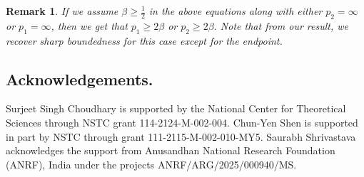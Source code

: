 \documentclass[a4paper,reqno]{amsart}
\newtheorem{remark}[thm]{Remark}
\numberwithin{equation}{section}
\begin{document}
	\begin{remark}
		If we assume $\beta\geq\frac{1}{2}$ in the above equations along with either $p_2=\infty$ or $p_1=\infty$, then we get that $p_1\geq2\beta$ or $p_2\geq2\beta$. Note that from our result, we recover sharp boundedness for this case except for the endpoint.
	\end{remark}
	
	
	\subsection*{Acknowledgements.} Surjeet Singh Choudhary is supported by the National Center for Theoretical Sciences through NSTC grant 114-2124-M-002-004. Chun-Yen Shen is supported in part by NSTC through grant 111-2115-M-002-010-MY5. Saurabh Shrivastava acknowledges the support from Anusandhan National Research Foundation (ANRF), India under the projects ANRF/ARG/2025/000940/MS. 
	
	
	
\end{document}
